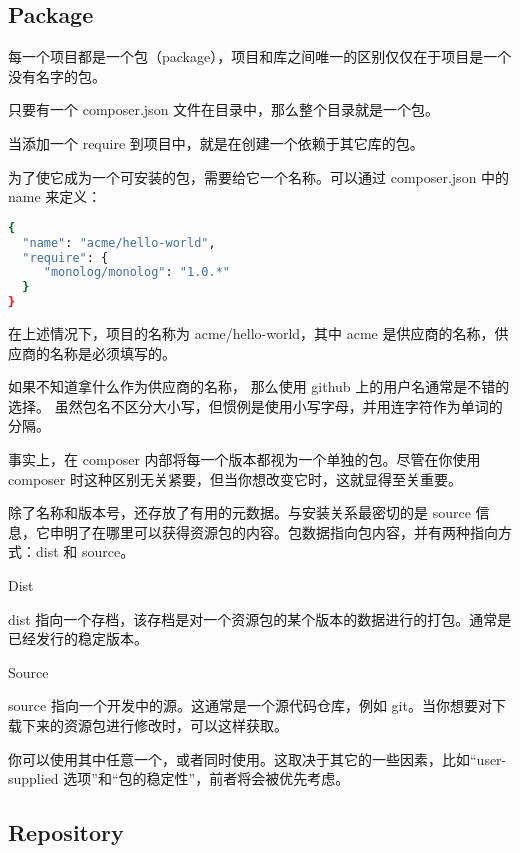 \subsection{Package}


每一个项目都是一个包（package），项目和库之间唯一的区别仅仅在于项目是一个没有名字的包。



只要有一个 composer.json 文件在目录中，那么整个目录就是一个包。

当添加一个 require 到项目中，就是在创建一个依赖于其它库的包。


为了使它成为一个可安装的包，需要给它一个名称。可以通过 composer.json 中的 name 来定义：



\begin{lstlisting}[language=bash]
{
  "name": "acme/hello-world",
  "require": {
     "monolog/monolog": "1.0.*"
  }
}
\end{lstlisting}


在上述情况下，项目的名称为 acme/hello-world，其中 acme 是供应商的名称，供应商的名称是必须填写的。


如果不知道拿什么作为供应商的名称， 那么使用 github 上的用户名通常是不错的选择。 虽然包名不区分大小写，但惯例是使用小写字母，并用连字符作为单词的分隔。

事实上，在 composer 内部将每一个版本都视为一个单独的包。尽管在你使用 composer 时这种区别无关紧要，但当你想改变它时，这就显得至关重要。

除了名称和版本号，还存放了有用的元数据。与安装关系最密切的是 source 信息，它申明了在哪里可以获得资源包的内容。包数据指向包内容，并有两种指向方式：dist 和 source。

\begin{compactitem}
\item Dist

dist 指向一个存档，该存档是对一个资源包的某个版本的数据进行的打包。通常是已经发行的稳定版本。

\item Source

source 指向一个开发中的源。这通常是一个源代码仓库，例如 git。当你想要对下载下来的资源包进行修改时，可以这样获取。
\end{compactitem}

你可以使用其中任意一个，或者同时使用。这取决于其它的一些因素，比如“user-supplied 选项”和“包的稳定性”，前者将会被优先考虑。

\subsection{Repository}

